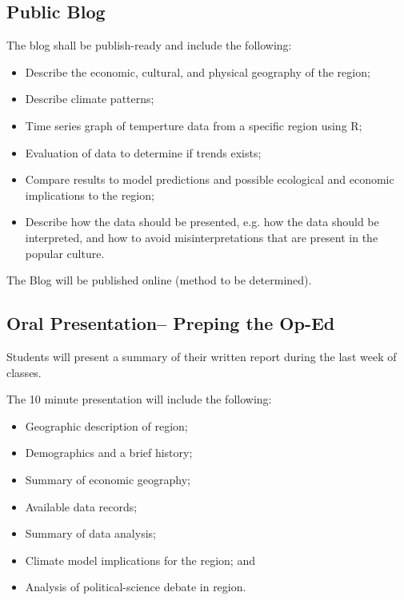 \documentclass{article}\usepackage[]{graphicx}\usepackage[]{color}
\begin{document}
\subsection{Public Blog}

The blog shall be publish-ready and include the following: 

\begin{itemize}
  \item Describe the economic, cultural, and physical geography of the region;
  \item Describe climate patterns;
  \item Time series graph of temperture data from a specific region using R;
  \item Evaluation of data to determine if trends exists;
  \item Compare results to model predictions and possible ecological and economic implications to the region; 
  \item Describe how the data should be presented, e.g. how the data should be interpreted, and how to avoid misinterpretations that are present in the popular culture.
  
\end{itemize}

The Blog will be published online (method to be determined).

\subsection{Oral Presentation-- Preping the Op-Ed}

Students will present a summary of their written report during the last week of classes. 

The 10 minute presentation will include the following:

\begin{itemize}
  \item Geographic description of region;
  \item Demographics and a brief history;
  \item Summary of economic geography;
  \item Available data records;
  \item Summary of data analysis;
  \item Climate model implications for the region; and
  \item Analysis of political-science debate in region.
  
\end{itemize}
\end{document}
